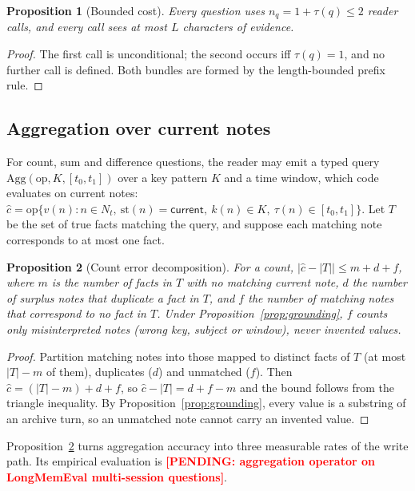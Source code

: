 \documentclass[10pt]{article}
\theoremstyle{plain}
\newtheorem{proposition}{Proposition}
\theoremstyle{definition}
\theoremstyle{remark}
\newcommand{\pending}[1]{\textcolor{red}{\textbf{[PENDING: #1]}}}
\begin{document}
\begin{proposition}[Bounded cost]
\label{prop:cost}
Every question uses $n_q=1+\tau(q)\le2$ reader calls, and every call sees at most
$L$ characters of evidence.
\end{proposition}

\begin{proof}
The first call is unconditional; the second occurs iff $\tau(q)=1$, and no further
call is defined. Both bundles are formed by the length-bounded prefix rule.
\end{proof}

\subsection{Aggregation over current notes}
\label{sec:agg}

For count, sum and difference questions, the reader may emit a typed query
$\mathrm{Agg}(\text{op},K,[t_0,t_1])$ over a key pattern $K$ and a time window,
which code evaluates on current notes:
$\hat c=\mathrm{op}\{v(n): n\in N_t,\ \mathrm{st}(n)=\textsf{current},\ k(n)\in K,\ \tau(n)\in[t_0,t_1]\}$.
Let $T$ be the set of true facts matching the query, and suppose each matching note
corresponds to at most one fact.

\begin{proposition}[Count error decomposition]
\label{prop:agg}
For a count, $|\hat c-|T||\le m+d+f$, where $m$ is the number of facts in $T$ with
no matching current note, $d$ the number of surplus notes that duplicate a fact
in $T$, and $f$ the number of matching notes that correspond to no fact in $T$.
Under Proposition~\ref{prop:grounding}, $f$ counts only misinterpreted notes (wrong key, subject
or window), never invented values.
\end{proposition}

\begin{proof}
Partition matching notes into those mapped to distinct facts of $T$ (at most
$|T|-m$ of them), duplicates ($d$) and unmatched ($f$). Then
$\hat c=(|T|-m)+d+f$, so $\hat c-|T|=d+f-m$ and the bound follows from the triangle
inequality. By Proposition~\ref{prop:grounding}, every value is a substring of an archive turn,
so an unmatched note cannot carry an invented value.
\end{proof}

Proposition~\ref{prop:agg} turns aggregation accuracy into three measurable rates of the
write path. Its empirical evaluation is \pending{aggregation operator on
LongMemEval multi-session questions}.
\end{document}
